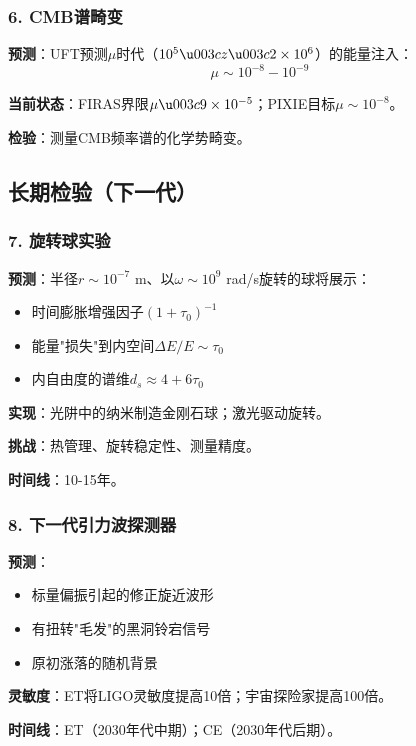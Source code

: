 \subsubsection{6. CMB谱畸变}

\begin{test}
\textbf{预测}：UFT预测$\mu$时代（$10^5 \u003c z \u003c 2 \times 10^6$）的能量注入：
\begin{equation}
    \mu \sim 10^{-8} - 10^{-9}
\end{equation}

\textbf{当前状态}：FIRAS界限$\mu \u003c 9 \times 10^{-5}$；PIXIE目标$\mu \sim 10^{-8}$。

\textbf{检验}：测量CMB频率谱的化学势畸变。
\end{test}

\subsection{长期检验（下一代）}

\subsubsection{7. 旋转球实验}

\begin{test}[纳米尺度快速旋转球]
\textbf{预测}：半径$r \sim 10^{-7}$ m、以$\omega \sim 10^9$ rad/s旋转的球将展示：
\begin{itemize}
    \item 时间膨胀增强因子$(1 + \tau_0)^{-1}$
    \item 能量"损失"到内空间$\Delta E/E \sim \tau_0$
    \item 内自由度的谱维$d_s \approx 4 + 6\tau_0$
\end{itemize}

\textbf{实现}：光阱中的纳米制造金刚石球；激光驱动旋转。

\textbf{挑战}：热管理、旋转稳定性、测量精度。

\textbf{时间线}：10-15年。
\end{test}

\subsubsection{8. 下一代引力波探测器}

\begin{test}
\textbf{预测}：
\begin{itemize}
    \item 标量偏振引起的修正旋近波形
    \item 有扭转"毛发"的黑洞铃宕信号
    \item 原初涨落的随机背景
\end{itemize}

\textbf{灵敏度}：ET将LIGO灵敏度提高10倍；宇宙探险家提高100倍。

\textbf{时间线}：ET（2030年代中期）；CE（2030年代后期）。
\end{test}

